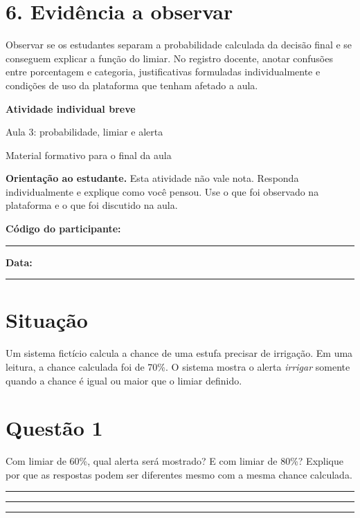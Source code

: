 \documentclass[12pt,a4paper]{article}
\newcommand{\linha}{\rule{\linewidth}{0.35pt}}
\newcommand{\bloco}[1]{%
  \vspace{0.25em}
  \noindent\colorbox{cinza}{\parbox{0.96\linewidth}{#1}}%
  \vspace{0.3em}
}
\begin{document}
\section*{6. Evidência a observar}

Observar se os estudantes separam a probabilidade calculada da decisão final e se conseguem explicar a função do limiar. No registro docente, anotar confusões entre porcentagem e categoria, justificativas formuladas individualmente e condições de uso da plataforma que tenham afetado a aula.

\newpage

\begin{center}
  {\LARGE\bfseries\color{azul} Atividade individual breve}\par
  \vspace{0.2em}
  {\large Aula 3: probabilidade, limiar e alerta}\par
  \vspace{0.35em}
  {\small Material formativo para o final da aula}\par
\end{center}

\bloco{\textbf{Orientação ao estudante.} Esta atividade não vale nota. Responda individualmente e explique como você pensou. Use o que foi observado na plataforma e o que foi discutido na aula.}

\textbf{Código do participante:} \rule{5cm}{0.4pt}
\hfill
\textbf{Data:} \rule{3cm}{0.4pt}

\section*{Situação}

Um sistema fictício calcula a chance de uma estufa precisar de irrigação. Em uma leitura, a chance calculada foi de 70\%. O sistema mostra o alerta \textit{irrigar} somente quando a chance é igual ou maior que o limiar definido.

\section*{Questão 1}

Com limiar de 60\%, qual alerta será mostrado? E com limiar de 80\%? Explique por que as respostas podem ser diferentes mesmo com a mesma chance calculada.

\vspace{0.25em}
\linha\par\vspace{0.75em}
\linha\par\vspace{0.75em}
\linha
\end{document}
